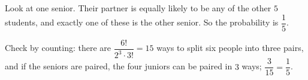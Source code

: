 Look at one senior. Their partner is equally likely to be any of the other $5$ students, and exactly one of these is the other senior. So the probability is $\boxed{\dfrac{1}{5}}$.

Check by counting: there are $\dfrac{6!}{2^3\cdot3!}=15$ ways to split six people into three pairs, and if the seniors are paired, the four juniors can be paired in $3$ ways; $\dfrac{3}{15}=\dfrac{1}{5}$.
